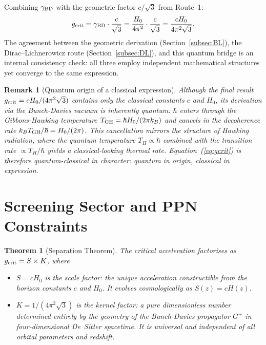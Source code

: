 \documentclass[11pt,a4paper]{article}
\newtheorem{theorem}{Theorem}[section]
\newtheorem{remark}{Remark}[section]
\begin{document}
Combining $\gamma_{\rm BD}$ with the geometric factor $c/\sqrt{3}$ from Route~1:
\begin{equation}
  g_{\rm crit} = \gamma_{\rm BD}\cdot\frac{c}{\sqrt{3}}
  = \frac{H_0}{4\pi^2}\cdot\frac{c}{\sqrt{3}}
  = \frac{cH_0}{4\pi^2\sqrt{3}}.
\end{equation}
The agreement between the geometric derivation (Section~\ref{subsec:BL}),
the Dirac--Lichnerowicz route (Section~\ref{subsec:DL}), and this quantum
bridge is an internal consistency check: all three employ independent mathematical
structures yet converge to the same expression.

\begin{remark}[Quantum origin of a classical expression]
Although the final result $g_{\rm crit} = cH_0/(4\pi^2\sqrt{3})$ contains only the
classical constants $c$ and $H_0$, its derivation via the Bunch-Davies vacuum is
inherently quantum: $\hbar$ enters through the Gibbons-Hawking temperature
$T_{\rm GH} = \hbar H_0 / (2\pi k_B)$ and cancels in the decoherence rate
$k_B T_{\rm GH}/\hbar = H_0/(2\pi)$.  This cancellation mirrors the structure of
Hawking radiation, where the quantum temperature $T_H\propto\hbar$ combined with
the transition rate $\propto T_H/\hbar$ yields a classical-looking thermal rate.
Equation~(\ref{eq:gcrit}) is therefore quantum-classical in character: quantum in
origin, classical in expression.
\end{remark}

\section{Screening Sector and PPN Constraints}
\label{sec:screening}

\begin{theorem}[Separation Theorem]
\label{thm:separation}
The critical acceleration factorises as $g_{\rm crit} = S \times K$, where
\begin{itemize}
  \item $S = cH_0$ is the \emph{scale factor}: the unique acceleration constructible
        from the horizon constants $c$ and $H_0$.  It evolves cosmologically as
        $S(z) = cH(z)$.
  \item $K = 1/(4\pi^2\sqrt{3})$ is the \emph{kernel factor}: a pure dimensionless
        number determined entirely by the geometry of the Bunch-Davies propagator
        $G^+$ in four-dimensional De~Sitter spacetime.  It is universal and
        independent of all orbital parameters and redshift.
\end{itemize}
\end{theorem}
\end{document}
